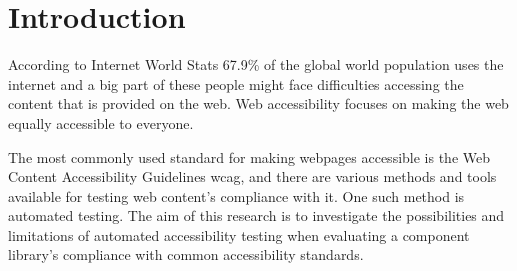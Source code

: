\documentclass{master_thesis}
\begin{document}
\section{Introduction} \label{chap:intro}




According to Internet World Stats 67.9\% of the global world population uses the internet \citep{MMG2023} and a big part of these people might face difficulties accessing the content that is provided on the web. Web accessibility focuses on making the web equally accessible to everyone.


The most commonly used standard for making webpages accessible is the Web Content Accessibility Guidelines \ac{wcag}, and there are various methods and tools available for testing web content's compliance with it. One such method is automated testing. The aim of this research is to investigate the possibilities and limitations of automated accessibility testing when evaluating a component library's compliance with common accessibility standards.


\end{document}
